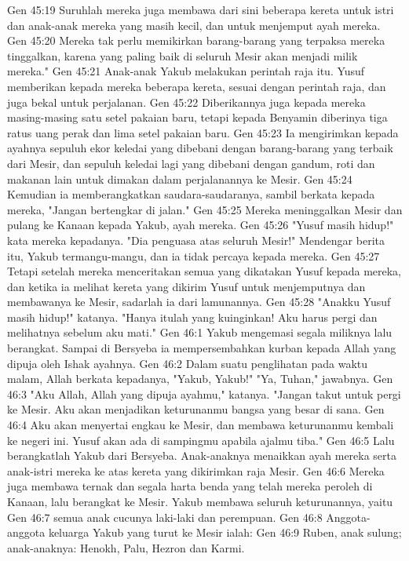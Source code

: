 Gen 45:19  Suruhlah mereka juga membawa dari sini beberapa kereta untuk istri dan anak-anak mereka yang masih kecil, dan untuk menjemput ayah mereka.
Gen 45:20  Mereka tak perlu memikirkan barang-barang yang terpaksa mereka tinggalkan, karena yang paling baik di seluruh Mesir akan menjadi milik mereka."
Gen 45:21  Anak-anak Yakub melakukan perintah raja itu. Yusuf memberikan kepada mereka beberapa kereta, sesuai dengan perintah raja, dan juga bekal untuk perjalanan.
Gen 45:22  Diberikannya juga kepada mereka masing-masing satu setel pakaian baru, tetapi kepada Benyamin diberinya tiga ratus uang perak dan lima setel pakaian baru.
Gen 45:23  Ia mengirimkan kepada ayahnya sepuluh ekor keledai yang dibebani dengan barang-barang yang terbaik dari Mesir, dan sepuluh keledai lagi yang dibebani dengan gandum, roti dan makanan lain untuk dimakan dalam perjalanannya ke Mesir.
Gen 45:24  Kemudian ia memberangkatkan saudara-saudaranya, sambil berkata kepada mereka, "Jangan bertengkar di jalan."
Gen 45:25  Mereka meninggalkan Mesir dan pulang ke Kanaan kepada Yakub, ayah mereka.
Gen 45:26  "Yusuf masih hidup!" kata mereka kepadanya. "Dia penguasa atas seluruh Mesir!" Mendengar berita itu, Yakub termangu-mangu, dan ia tidak percaya kepada mereka.
Gen 45:27  Tetapi setelah mereka menceritakan semua yang dikatakan Yusuf kepada mereka, dan ketika ia melihat kereta yang dikirim Yusuf untuk menjemputnya dan membawanya ke Mesir, sadarlah ia dari lamunannya.
Gen 45:28  "Anakku Yusuf masih hidup!" katanya. "Hanya itulah yang kuinginkan! Aku harus pergi dan melihatnya sebelum aku mati."
Gen 46:1  Yakub mengemasi segala miliknya lalu berangkat. Sampai di Bersyeba ia mempersembahkan kurban kepada Allah yang dipuja oleh Ishak ayahnya.
Gen 46:2  Dalam suatu penglihatan pada waktu malam, Allah berkata kepadanya, "Yakub, Yakub!" "Ya, Tuhan," jawabnya.
Gen 46:3  "Aku Allah, Allah yang dipuja ayahmu," katanya. "Jangan takut untuk pergi ke Mesir. Aku akan menjadikan keturunanmu bangsa yang besar di sana.
Gen 46:4  Aku akan menyertai engkau ke Mesir, dan membawa keturunanmu kembali ke negeri ini. Yusuf akan ada di sampingmu apabila ajalmu tiba."
Gen 46:5  Lalu berangkatlah Yakub dari Bersyeba. Anak-anaknya menaikkan ayah mereka serta anak-istri mereka ke atas kereta yang dikirimkan raja Mesir.
Gen 46:6  Mereka juga membawa ternak dan segala harta benda yang telah mereka peroleh di Kanaan, lalu berangkat ke Mesir. Yakub membawa seluruh keturunannya, yaitu
Gen 46:7  semua anak cucunya laki-laki dan perempuan.
Gen 46:8  Anggota-anggota keluarga Yakub yang turut ke Mesir ialah:
Gen 46:9  Ruben, anak sulung; anak-anaknya: Henokh, Palu, Hezron dan Karmi.
